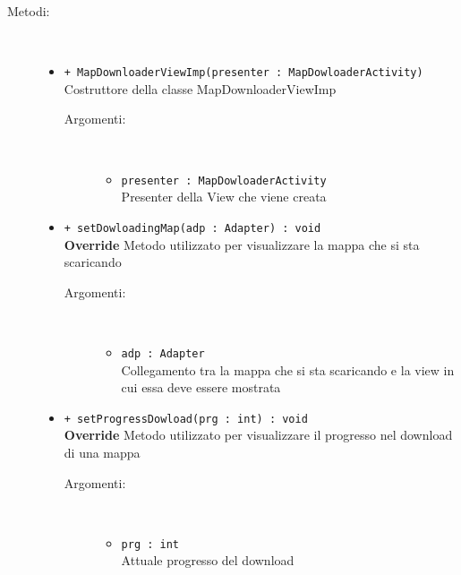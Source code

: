 \documentclass[../DefinizioneDiProdotto.tex]{subfiles}
\begin{document}
\begin{description}
\begin{itemize}
	\end{itemize}
	\item[Metodi:] \
	\begin{itemize}
		\item \texttt{+ MapDownloaderViewImp(presenter : MapDowloaderActivity)}\\
		Costruttore della classe MapDownloaderViewImp
		\begin{description}
			\item[Argomenti:] \
			\begin{itemize}
				\item \texttt{presenter : MapDowloaderActivity}\\
				Presenter della View che viene creata\end{itemize}
		\end{description}
		\item \texttt{+ setDowloadingMap(adp : Adapter) : void}\\
		\textbf{Override} Metodo utilizzato per visualizzare la mappa che si sta scaricando
		\begin{description}
			\item[Argomenti:] \
			\begin{itemize}
				\item \texttt{adp : Adapter}\\
				Collegamento tra la mappa che si sta scaricando e la view in cui essa deve essere mostrata\end{itemize}
		\end{description}
		\item \texttt{+ setProgressDowload(prg : int) : void}\\
		\textbf{Override} Metodo utilizzato per visualizzare il progresso nel download di una mappa
		\begin{description}
			\item[Argomenti:] \
			\begin{itemize}
				\item \texttt{prg : int}\\
				Attuale progresso del download\end{itemize}
		\end{description}
	\end{itemize}
\end{description}
\end{document}
